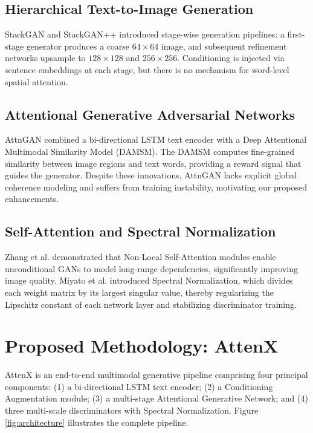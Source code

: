 \documentclass[conference]{IEEEtran}
\begin{document}
\subsection{Hierarchical Text-to-Image Generation}
StackGAN \cite{zhang2017stackgan} and StackGAN++ \cite{zhang2018stackgan++} introduced stage-wise generation pipelines: a first-stage generator produces a coarse $64\times64$ image, and subsequent refinement networks upsample to $128\times128$ and $256\times256$. Conditioning is injected via sentence embeddings at each stage, but there is no mechanism for word-level spatial attention.

\subsection{Attentional Generative Adversarial Networks}
AttnGAN \cite{xu2018attngan} combined a bi-directional LSTM text encoder with a Deep Attentional Multimodal Similarity Model (DAMSM). The DAMSM computes fine-grained similarity between image regions and text words, providing a reward signal that guides the generator. Despite these innovations, AttnGAN lacks explicit global coherence modeling and suffers from training instability, motivating our proposed enhancements.

\subsection{Self-Attention and Spectral Normalization}
Zhang et al. \cite{zhang2019self} demonstrated that Non-Local Self-Attention modules enable unconditional GANs to model long-range dependencies, significantly improving image quality. Miyato et al. \cite{miyato2018spectral} introduced Spectral Normalization, which divides each weight matrix by its largest singular value, thereby regularizing the Lipschitz constant of each network layer and stabilizing discriminator training.

\section{Proposed Methodology: AttenX}
\label{sec:method}

AttenX is an end-to-end multimodal generative pipeline comprising four principal components: (1) a bi-directional LSTM text encoder; (2) a Conditioning Augmentation module; (3) a multi-stage Attentional Generative Network; and (4) three multi-scale discriminators with Spectral Normalization. Figure \ref{fig:architecture} illustrates the complete pipeline.
\end{document}
